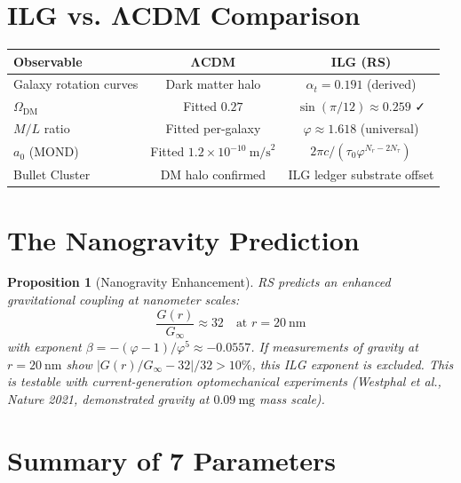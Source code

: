 \documentclass[12pt,a4paper]{article}
\newtheorem{proposition}[theorem]{Proposition}
\theoremstyle{definition}
\theoremstyle{remark}
\begin{document}
\section{ILG vs. ΛCDM Comparison}

\begin{center}
\begin{tabular}{lcc}
\hline
\textbf{Observable} & \textbf{ΛCDM} & \textbf{ILG (RS)} \\
\hline
Galaxy rotation curves & Dark matter halo & $\alpha_t = 0.191$ (derived) \\
$\Omega_\mathrm{DM}$ & Fitted $0.27$ & $\sin(\pi/12) \approx 0.259$ ✓ \\
$M/L$ ratio & Fitted per-galaxy & $\varphi \approx 1.618$ (universal) \\
$a_0$ (MOND) & Fitted $1.2 \times 10^{-10}~\text{m/s}^2$ & $2\pi c/(\tau_0 \varphi^{N_r - 2N_\tau})$ \\
Bullet Cluster & DM halo confirmed & ILG ledger substrate offset \\
\hline
\end{tabular}
\end{center}

\section{The Nanogravity Prediction}

\begin{proposition}[Nanogravity Enhancement]
RS predicts an enhanced gravitational coupling at nanometer scales:
\begin{equation}
\frac{G(r)}{G_\infty} \approx 32 \quad \text{at } r = 20~\text{nm}
\end{equation}
with exponent $\beta = -(\varphi - 1)/\varphi^5 \approx -0.0557$.
If measurements of gravity at $r = 20~\text{nm}$ show 
$|G(r)/G_\infty - 32|/32 > 10\%$, this ILG exponent is excluded.
This is testable with current-generation optomechanical experiments 
(Westphal et al., Nature 2021, demonstrated gravity at $0.09~\text{mg}$ mass scale).
\end{proposition}

\section{Summary of 7 Parameters}
\end{document}
